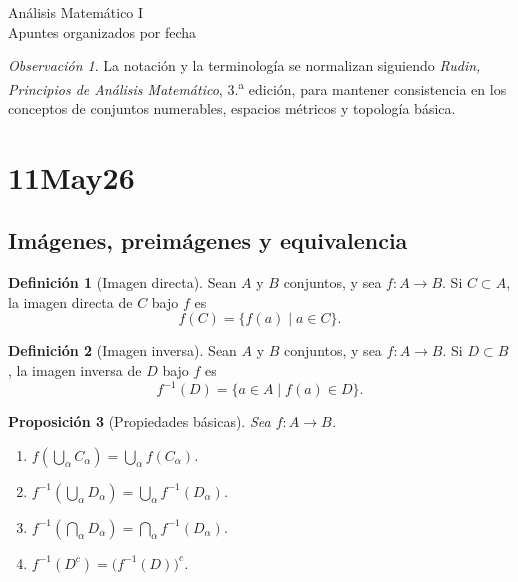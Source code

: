 \documentclass[12pt]{article}
\theoremstyle{definition}
\newtheorem{definition}{Definición}[section]
\theoremstyle{plain}
\newtheorem{proposition}[definition]{Proposición}
\theoremstyle{remark}
\newtheorem*{remark}{Observación}
\begin{document}
\begin{center}
{\Large Análisis Matemático I}\\[2mm]
{\large Apuntes organizados por fecha}\\[2mm]
\end{center}

\begin{remark}
La notación y la terminología se normalizan siguiendo \textit{Rudin, Principios de Análisis Matemático}, 3.\textsuperscript{a} edición, para mantener consistencia en los conceptos de conjuntos numerables, espacios métricos y topología básica.
\end{remark}

\section*{11May26}

\subsection*{Imágenes, preimágenes y equivalencia}

\begin{definition}[Imagen directa]
Sean $A$ y $B$ conjuntos, y sea $f\colon A\to B$.
Si $C\subset A$, la imagen directa de $C$ bajo $f$ es
\[
f(C)=\{f(a)\mid a\in C\}.
\]
\end{definition}

\begin{definition}[Imagen inversa]
Sean $A$ y $B$ conjuntos, y sea $f\colon A\to B$.
Si $D\subset B$, la imagen inversa de $D$ bajo $f$ es
\[
f^{-1}(D)=\{a\in A\mid f(a)\in D\}.
\]
\end{definition}

\begin{proposition}[Propiedades básicas]
Sea $f\colon A\to B$.
\begin{enumerate}[label=\arabic*.]
    \item $f\!\left(\bigcup_\alpha C_\alpha\right)=\bigcup_\alpha f(C_\alpha)$.
    \item $f^{-1}\!\left(\bigcup_\alpha D_\alpha\right)=\bigcup_\alpha f^{-1}(D_\alpha)$.
    \item $f^{-1}\!\left(\bigcap_\alpha D_\alpha\right)=\bigcap_\alpha f^{-1}(D_\alpha)$.
    \item $f^{-1}(D^c)=\bigl(f^{-1}(D)\bigr)^c$.
\end{enumerate}
\end{proposition}
\end{document}
